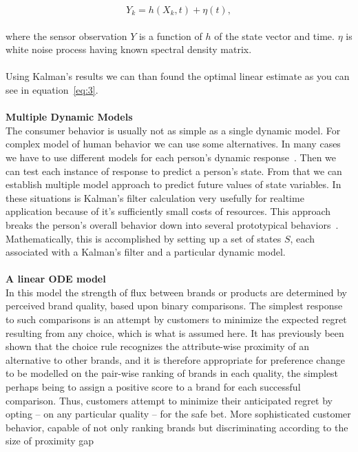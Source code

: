 \begin{equation} \label{eq:2}
Y_k = h(X_k, t) + \eta(t),
\end{equation}
\\
where the sensor observation $Y$ is a function of $h$ of the state vector and time. $\eta$ is white noise process having known spectral density matrix.\\
\\
Using Kalman's results we can than found the optimal linear estimate as you can see in equation~\ref{eq:3}.\\
\\
\textbf{Multiple Dynamic Models} \label{subsec:multipleDynamicModels}\\
The consumer behavior is usually not as simple as a single dynamic model.
For complex model of human behavior we can use some alternatives.
In many cases we have to use different models for each person's dynamic response~\cite{wilsky}.
Then we can test each instance of response to predict a person's state.
From that we can establish multiple model approach to predict future values of state variables.
In these situations is Kalman's filter calculation very usefully for realtime application because of it's sufficiently small costs of resources.
This approach breaks the person's overall behavior down into several prototypical behaviors~\cite{pantland}.
Mathematically, this is accomplished by setting up a set of states $S$, each associated with a Kalman's filter and a particular dynamic model.\\
\\
\textbf{A linear ODE model} \label{subsec:ode}\\
In this model the strength of flux between brands or products are determined by perceived brand quality,
based upon binary comparisons.
The simplest response to such comparisons is an attempt by customers to minimize the expected regret resulting
from any choice, which is what is assumed here.
It has previously been shown that the choice rule recognizes the attribute-wise proximity of an alternative
to other brands, and it is therefore appropriate for preference change to be modelled on the pair-wise ranking
of brands in each quality, the simplest perhaps being to assign a positive score to a brand for each successful comparison.
Thus, customers attempt to minimize their anticipated regret by opting – on any particular quality – for the safe bet.
More sophisticated customer behavior, capable of not only ranking brands but discriminating according to the size of proximity gap
